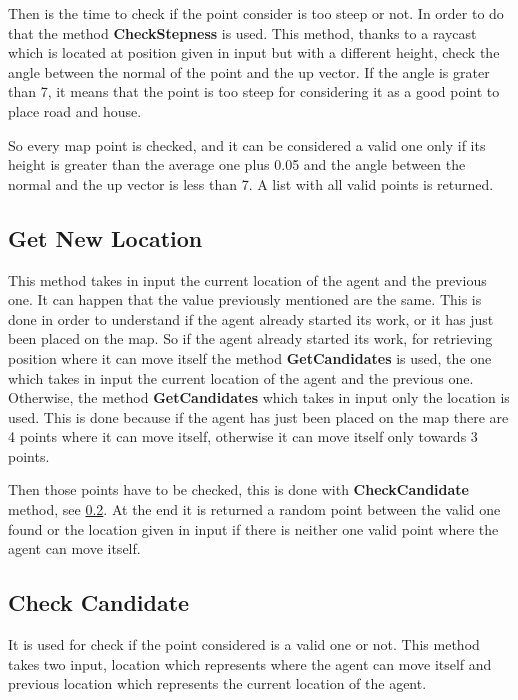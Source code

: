 \documentclass[12pt]{article}
\begin{document}
    Then is the time to check if the point consider is too steep or not. In order to do that the method \textbf{CheckStepness} is used. This method, thanks to a
    raycast which is located at position given in input but with a different height, check the angle between the normal of the point and the up vector. If the 
    angle is grater than 7, it means that the point is too steep for considering it as a good point to place road and house.
    
    So every map point is checked, and it can be considered a valid one only if its height is greater than the average one plus 0.05 and the angle between the normal 
    and the up vector is less than 7. A list with all valid points is returned.

    \subsection{Get New Location} \label{section:NewLocation}
    This method takes in input the current location of the agent and the previous one. It can happen that the value previously mentioned are the same. This is done in order
    to understand if the agent already started its work, or it has just been placed on the map. So if the agent already started its work, for retrieving position where it
    can move itself the method \textbf{GetCandidates} is used, the one which takes in input the current location of the agent and the previous one. Otherwise, the method
    \textbf{GetCandidates} which takes in input only the location is used. This is done because if the agent has just been placed on the map there are 4 points 
    where it can move itself, otherwise it can move itself only towards 3 points.
    
    Then those points have to be checked, this is done with \textbf{CheckCandidate} method, see \ref{section:CheckCandidate}. At the end it is returned a random point
    between the valid one found or the location given in input if there is neither one valid point where the agent can move itself.
     
    \subsection{Check Candidate} \label{section:CheckCandidate}
    It is used for check if the point considered is a valid one or not. This method takes two input, location which represents where the agent can move itself and 
    previous location which represents the current location of the agent.
\end{document}

